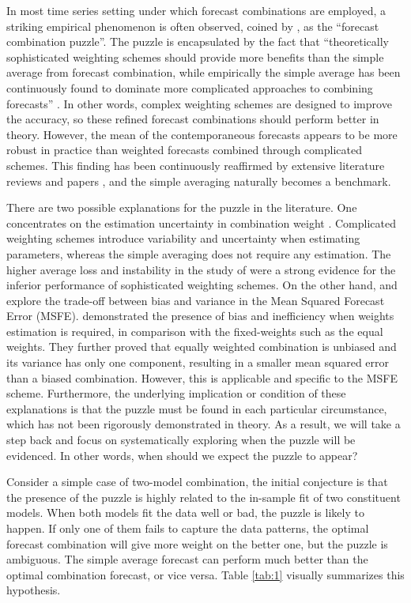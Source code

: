 \documentclass{monashthesis}
\begin{document}
In most time series setting under which forecast combinations are employed, a striking empirical phenomenon is often observed, coined by \textcite{SW04}, as the ``forecast combination puzzle''. The puzzle is encapsulated by the fact that ``theoretically sophisticated weighting schemes should provide more benefits than the simple average from forecast combination, while empirically the simple average has been continuously found to dominate more complicated approaches to combining forecasts'' \autocite{WHLK22}. In other words, complex weighting schemes are designed to improve the accuracy, so these refined forecast combinations should perform better in theory. However, the mean of the contemporaneous forecasts appears to be more robust in practice than weighted forecasts combined through complicated schemes. This finding has been continuously reaffirmed by extensive literature reviews and papers \autocites[e.g.,][]{C89,SW98,SW04,SW09,MSA18,MSA20}, and the simple averaging naturally becomes a benchmark.

There are two possible explanations for the puzzle in the literature. One concentrates on the estimation uncertainty in combination weight \autocite{SW98,SW04,SW09}. Complicated weighting schemes introduce variability and uncertainty when estimating parameters, whereas the simple averaging does not require any estimation. The higher average loss and instability in the study of \textcite{SW04} were a strong evidence for the inferior performance of sophisticated weighting schemes. On the other hand, \textcite{E11} and \textcite{CMVW16} explore the trade-off between bias and variance in the Mean Squared Forecast Error (MSFE). \textcite{CMVW16} demonstrated the presence of bias and inefficiency when weights estimation is required, in comparison with the fixed-weights such as the equal weights. They further proved that equally weighted combination is unbiased and its variance has only one component, resulting in a smaller mean squared error than a biased combination. However, this is applicable and specific to the MSFE scheme. Furthermore, the underlying implication or condition of these explanations is that the puzzle must be found in each particular circumstance, which has not been rigorously demonstrated in theory. As a result, we will take a step back and focus on systematically exploring when the puzzle will be evidenced. In other words, when should we expect the puzzle to appear?

Consider a simple case of two-model combination, the initial conjecture is that the presence of the puzzle is highly related to the in-sample fit of two constituent models. When both models fit the data well or bad, the puzzle is likely to happen. If only one of them fails to capture the data patterns, the optimal forecast combination will give more weight on the better one, but the puzzle is ambiguous. The simple average forecast can perform much better than the optimal combination forecast, or vice versa. Table \ref{tab:1} visually summarizes this hypothesis.
\end{document}
